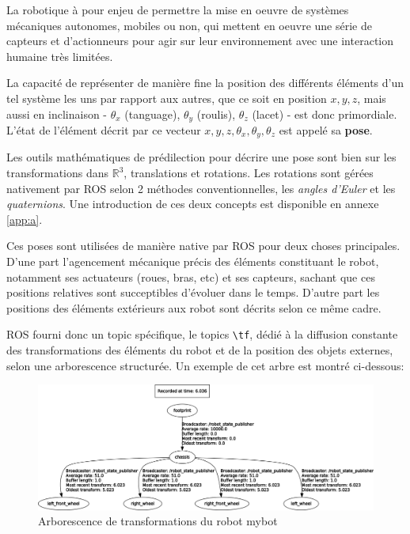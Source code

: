\documentclass[12pt,a4paper]{report}
\begin{document}
		La robotique à pour enjeu de permettre la mise en oeuvre de systèmes mécaniques autonomes, mobiles ou non, qui mettent en oeuvre une série de capteurs et d'actionneurs pour agir sur leur environnement avec une interaction humaine très limitées.
		
		\para La capacité de représenter de manière fine la position des différents éléments d'un tel système les uns par rapport aux autres, que ce soit en position $x,y,z$, mais aussi en inclinaison - $\theta_x$ (tanguage), $\theta_y$ (roulis), $\theta_z$ (lacet) - est donc primordiale. L'état de l'élément décrit par ce vecteur $x,y,z, \theta_x, \theta_y, \theta_z$ est appelé sa \textbf{pose}. 
		
		\para Les outils mathématiques de prédilection pour décrire une pose sont bien sur les transformations dans $\mathbb{R}^3$, translations et rotations. Les rotations sont gérées nativement par ROS selon 2 méthodes conventionnelles, les \textit{angles d'Euler} et les \textit{quaternions}. Une introduction de ces deux concepts est disponible en annexe \ref{app:a}.
		
		\para Ces poses sont utilisées de manière native par ROS pour deux choses principales. D'une part l'agencement mécanique précis des éléments constituant le robot, notamment ses actuateurs (roues, bras, etc) et ses capteurs, sachant que ces positions relatives sont succeptibles d'évoluer dans le temps. D'autre part les positions des éléments extérieurs aux robot sont décrits selon ce même cadre.
		
		\para ROS fourni donc un topic spécifique, le topics \verb|\tf|, dédié à la diffusion constante des transformations des éléments du robot et de la position des objets externes, selon une arborescence structurée. Un exemple de cet arbre est montré ci-dessous:\begin{figure}[h!]
			\centering
			\includegraphics[width=1\linewidth]{img/framesmybot}
			\caption[framesmybot]{Arborescence de transformations du robot mybot}
			\label{fig:framesmybot}
		\end{figure}
		
\end{document}

